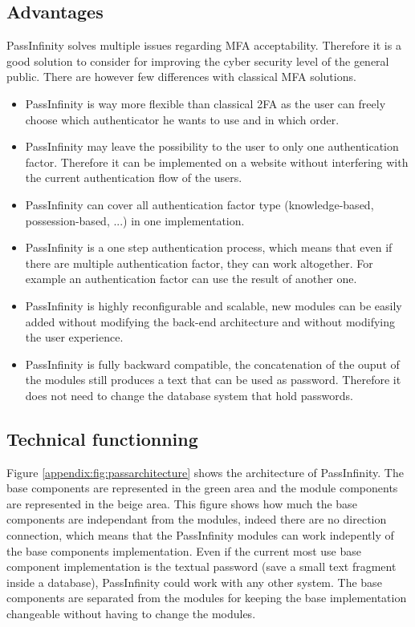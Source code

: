 \documentclass[twocolumn,14pt]{extarticle}
\begin{document}
\subsection{Advantages}
PassInfinity solves multiple issues regarding MFA acceptability. Therefore it is a good solution to consider for improving the cyber security level of the general public.\linebreak
There are however few differences with classical MFA solutions.
\begin{itemize}
\item PassInfinity is way more flexible than classical 2FA as the user can freely choose which authenticator he wants to use and in which order.
\item PassInfinity may leave the possibility to the user to only one authentication factor. Therefore it can be implemented on a website without interfering with the current authentication flow of the users.
\item PassInfinity can cover all authentication factor type (knowledge-based, possession-based, ...) in one implementation.
\item PassInfinity is a one step authentication process, which means that even if there are multiple authentication factor, they can work altogether. For example an authentication factor can use the result of another one.
\item PassInfinity is highly reconfigurable and scalable, new modules can be easily added without modifying the back-end architecture and without modifying the user experience.
\item PassInfinity is fully backward compatible, the concatenation of the ouput of the modules still produces a text that can be used as password. Therefore it does not need to change the database system that hold passwords.
\end{itemize}

\subsection{Technical functionning}

Figure \ref{appendix:fig:passarchitecture} shows the architecture of PassInfinity. The base components are represented in the green area and the module components are represented in the beige area. This figure shows how much the base components are independant from the modules, indeed there are no direction connection, which means that the PassInfinity modules can work indepently of the base components implementation. Even if the current most use base component implementation is the textual password (save a small text fragment inside a database), PassInfinity could work with any other system. The base components are separated from the modules for keeping the base implementation changeable without having to change the modules.
\end{document}
